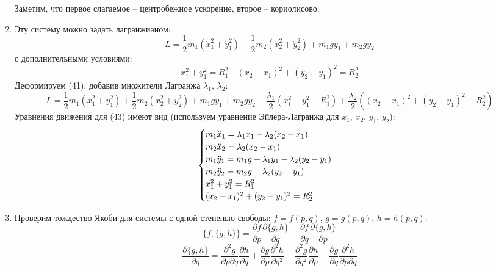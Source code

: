 \documentclass[12pt]{article}
\begin{document}
\begin{enumerate}
\begin{equation}
    \end{equation}
    Заметим, что первое слагаемое -- центробежное ускорение, второе -- кориолисово.
    \item Эту систему можно задать лагранжианом:
    \begin{equation}
        L=\frac{1}{2}m_1(\dot{x}_1^2+\dot{y}_1^2)+\frac{1}{2}m_2(\dot{x}_2^2+\dot{y}_2^2)+m_1gy_1+m_2gy_2
    \end{equation}
    с дополнительными условиями:
    \begin{equation}
        x_1^2+y_1^2=R_1^2\quad (x_2-x_1)^2+(y_2-y_1)^2=R_2^2
    \end{equation}
    Деформируем (41), добавив множители Лагранжа $\lambda_1$, $\lambda_2$:
    \begin{equation*}
        L=\frac{1}{2}m_1(\dot{x}_1^2+\dot{y}_1^2)+\frac{1}{2}m_2(\dot{x}_2^2+\dot{y}_2^2)+m_1gy_1+m_2gy_2+\frac{\lambda_1}{2}(x_1^2+y_1^2-R_1^2)+\frac{\lambda_2}{2}((x_2-x_1)^2+(y_2-y_1)^2-R_2^2)
    \end{equation*}
    Уравнения движения для (43) имеют вид (используем уравнение Эйлера-Лагранжа для $x_1$, $x_2$, $y_1$, $y_2$):
    \begin{equation}
        \begin{cases}
        m_1\Ddot{x}_1=\lambda_1 x_1-\lambda_2(x_2-x_1)\\
        m_2\Ddot{x}_2=\lambda_2 (x_2-x_1)\\
        m_1\Ddot{y}_1=m_1g+\lambda_1 y_1-\lambda_2(y_2-y_1)\\
        m_2\Ddot{y}_2=m_2g+\lambda_2 (y_2-y_1)\\
        x_1^2+y_1^2=R_1^2\\
        (x_2-x_1)^2+(y_2-y_1)^2=R_2^2
        \end{cases}
    \end{equation}
    \item Проверим тождество Якоби для системы с одной степенью свободы: $f=f(p,q)$, $g=g(p,q)$, $h=h(p,q)$.
    \begin{equation}
        \{f,\{g,h\}\}=\frac{\partial f}{\partial p}\frac{\partial \{g,h\}}{\partial q}-\frac{\partial f}{\partial q}\frac{\partial \{g,h\}}{\partial p}
    \end{equation}
    \begin{equation}
        \frac{\partial \{g,h\}}{\partial q}=\frac{\partial^2 g}{\partial p\partial q}\frac{\partial h}{\partial q}+\frac{\partial g}{\partial p}\frac{\partial^2 h}{\partial q^2}-\frac{\partial^2 g}{\partial q^2}\frac{\partial h}{\partial p}-\frac{\partial g}{\partial q}\frac{\partial^2 h}{\partial p\partial q}

\end{equation}
\end{enumerate}
\end{document}
